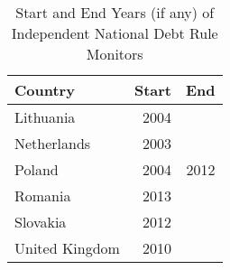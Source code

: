 \begin{table}[ht]
\centering
\caption{Start and End Years (if any) of Independent National Debt Rule Monitors\\} 
\label{indep_monitors}
\begin{tabular}{lrr}
  \hline
Country & Start & End \\ 
  \hline
Lithuania & 2004 &  \\ 
  Netherlands & 2003 &  \\ 
  Poland & 2004 & 2012 \\ 
  Romania & 2013 &  \\ 
  Slovakia & 2012 &  \\ 
  United Kingdom & 2010 &  \\ 
   \hline
\end{tabular}
\end{table}

